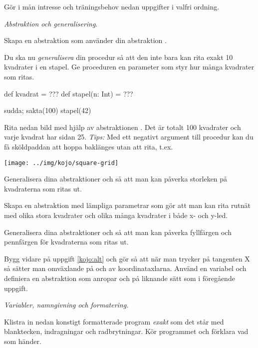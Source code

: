 \noindent Gör i mån intresse och träningsbehov nedan uppgifter i valfri ordning.

\Task \emph{Abstraktion och generalisering}.

\Subtask Skapa en abstraktion  som använder din abstraktion .

\Subtask Du ska nu \emph{generalisera} din procedur så att den inte bara kan rita exakt 10 kvadrater i en stapel. Ge proceduren  en parameter  som styr hur många kvadrater som ritas.
\begin{Code}
def kvadrat = ???
def stapel(n: Int) = ???

sudda; sakta(100)
stapel(42)
\end{Code}



\Subtask Rita nedan bild med hjälp av abstraktionen . Det är totalt 100 kvadrater och varje kvadrat har sidan 25. \emph{Tips:} Med ett negativt argument till procedur  kan du få sköldpaddan att hoppa baklänges utan att rita, t.ex. 

\texttt{[image: ../img/kojo/square-grid]}

\Subtask Generalisera dina abstraktioner  och  så att man kan påverka storleken på kvadraterna som ritas ut.

\Subtask Skapa en abstraktion  med lämpliga parametrar som gör att man kan rita rutnät med olika stora kvadrater och olika många kvadrater i både x- och y-led.

\Subtask Generalisera dina abstraktioner  och  så att man kan påverka fyllfärgen och pennfärgen för kvadraterna som ritas ut.

\Task Bygg vidare på uppgift \ref{kojo:alt} och gör så att när man trycker på tangenten X så sätter man omväxlande på och av koordinataxlarna. Använd en variabel  och definiera en abstraktion  som anropar  och  på liknande sätt som i föregående uppgift.


\Task \emph{Variabler, namngivning och formatering.}

\Subtask Klistra in nedan konstigt formatterade program \emph{exakt} som det står med blanktecken, indragningar och radbrytningar. Kör programmet och förklara vad som händer.

